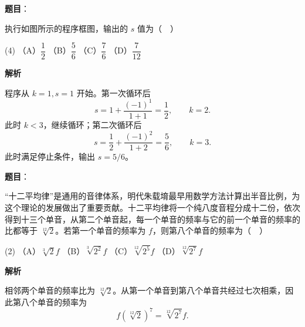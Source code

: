 \begin{answer}

\textbf{题目}：

执行如图所示的程序框图，输出的 $s$ 值为（　）
\nopagebreak[4]
\begin{center}\end{center}
\nopagebreak[4]
\begin{gkopts}(4)
\task （A）$\dfrac12$
\task （B）$\dfrac56$
\task （C）$\dfrac76$
\task （D）$\dfrac7{12}$
\end{gkopts}

\textbf{解析}

程序从 $k=1,s=1$ 开始。第一次循环后
\nopagebreak[4]
\[
s=1+\frac{(-1)^1}{1+1}=\frac12,\qquad k=2.
\]
此时 $k<3$，继续循环；第二次循环后
\nopagebreak[4]
\[
s=\frac12+\frac{(-1)^2}{1+2}=\frac56,\qquad k=3.
\]
此时满足停止条件，输出 $s=5/6$。


\end{answer}
\begin{answer}

\textbf{题目}：

“十二平均律”是通用的音律体系，明代朱载堉最早用数学方法计算出半音比例，为这个理论的发展做出了重要贡献。十二平均律将一个纯八度音程分成十二份，依次得到十三个单音，从第二个单音起，每一个单音的频率与它的前一个单音的频率的比都等于 $\sqrt[12]{2}$。若第一个单音的频率为 $f$，则第八个单音的频率为（　）

\begin{gkopts}(2)
\task （A）$\sqrt[3]{2}f$
\task （B）$\sqrt[3]{2^2}f$
\task （C）$\sqrt[12]{2^5}f$
\task （D）$\sqrt[12]{2^7}f$
\end{gkopts}

\textbf{解析}

相邻两个单音的频率比为 $\sqrt[12]{2}$。从第一个单音到第八个单音共经过七次相乘，因此第八个单音的频率为
\nopagebreak[4]
\[
f\left(\sqrt[12]{2}\right)^7=\sqrt[12]{2^7}f.
\]


\end{answer}
